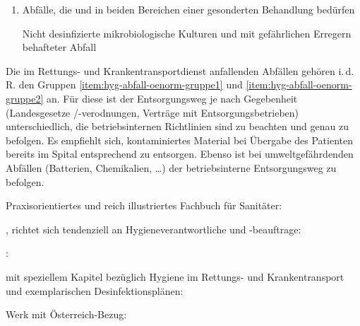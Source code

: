 {\begin{enumerate}
\begin{enumerate}
    Die Sammlung und der Transport dieser Abfälle haben in
    ausreichend dichten Gebinden bzw. Transportbehältern zu
    erfolgen.
    
    Plasma, Infusionslösungen,  und  sind
    unter Berücksichtigung der wasserrechtlichen
    Bestimmungen wie  zu behandeln. Bei der
    Entleerung der Gebinde sind die entsprechenden
    Hygienemaßnahmen einzuhalten.
  \end{enumerate}
  \item Abfälle, die  und in
  beiden Bereichen einer gesonderten Behandlung bedürfen
  \label{item:hyg-abfall-oenorm-gruppe3}
  
  Nicht desinfizierte mikrobiologische Kulturen und mit
  gefährlichen Erregern behafteter Abfall
  
\end{enumerate}
Die im Rettungs- und Krankentransportdienst anfallenden
Abfällen gehören i.\,d.\,R. den Gruppen
\ref{item:hyg-abfall-oenorm-gruppe1} und
\ref{item:hyg-abfall-oenorm-gruppe2} an. Für diese ist
der Entsorgungsweg je nach Gegebenheit (Landesgesetze
/-verodnungen, Verträge mit Entsorgungsbetrieben)
unterschiedlich, die betriebsinternen
Richtlinien sind zu beachten und genau zu befolgen. Es
empfiehlt sich, kontaminiertes Material bei Übergabe des
Patienten bereits im Spital entsprechend zu entsorgen.
Ebenso ist bei umweltgefährdenden Abfällen (Batterien,
Chemikalien, \ldots) der betriebsinterne Entsorgungsweg zu
befolgen.
}%


\nocite{KayserMikrobiologie10}
\nocite{HahnMikrobio6}
\nocite{BLIM3}
\nocite{OHCSP7}
\nocite{OeAG2007}


\begin{Literary}
  Praxisorientiertes und
  reich illustriertes Fachbuch für Sanitäter:
  {}


  , richtet sich
  tendenziell an Hygieneverantwortliche und -beauftrage:
  {}

 :
  {}

  mit
  speziellem Kapitel bezüglich Hygiene im Rettungs- und
  Krankentransport und exemplarischen
  Desinfektionsplänen:
  {}

 Werk mit Österreich-Bezug:
  {}
\end{Literary}


\ChapterBibliography

\ChapterEnd